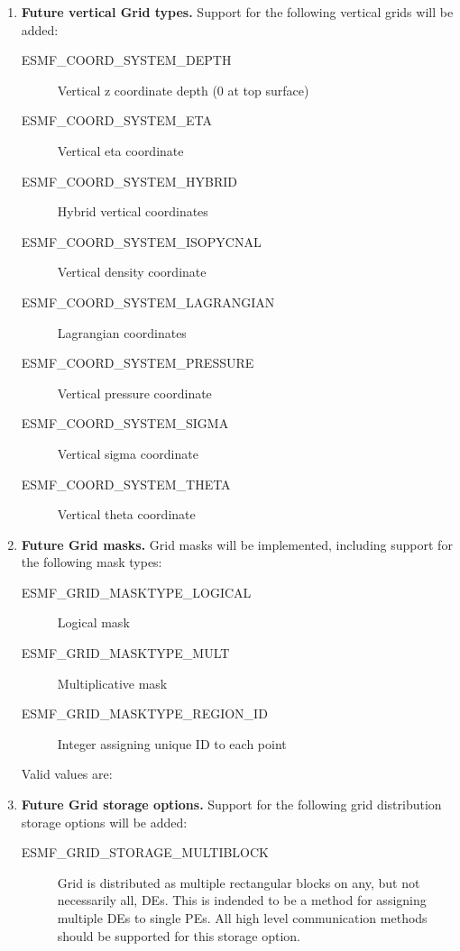 \begin{enumerate}
\item {\bf Future vertical Grid types.}  Support for the following
vertical grids will be added:
 \begin{description}
    \item [ESMF\_COORD\_SYSTEM\_DEPTH]
          Vertical z coordinate depth (0 at top surface)
    \item [ESMF\_COORD\_SYSTEM\_ETA]
          Vertical eta coordinate
    \item [ESMF\_COORD\_SYSTEM\_HYBRID]
          Hybrid vertical coordinates
    \item [ESMF\_COORD\_SYSTEM\_ISOPYCNAL]
          Vertical density coordinate
    \item [ESMF\_COORD\_SYSTEM\_LAGRANGIAN]
          Lagrangian coordinates
    \item [ESMF\_COORD\_SYSTEM\_PRESSURE]
          Vertical pressure coordinate
    \item [ESMF\_COORD\_SYSTEM\_SIGMA]
          Vertical sigma coordinate
    \item [ESMF\_COORD\_SYSTEM\_THETA]
          Vertical theta coordinate
 \end{description}

\item {\bf Future Grid masks.}  Grid masks will be implemented, including
support for the following mask types:
 \begin{description}
    \item [ESMF\_GRID\_MASKTYPE\_LOGICAL]
          Logical mask
    \item [ESMF\_GRID\_MASKTYPE\_MULT]
          Multiplicative mask
    \item [ESMF\_GRID\_MASKTYPE\_REGION\_ID]
          Integer assigning unique ID to each point
 \end{description}

    
 Valid values are:
\item {\bf Future Grid storage options.}  Support for the following grid
distribution storage options will be added:
 \begin{description}
    \item [ESMF\_GRID\_STORAGE\_MULTIBLOCK]
          Grid is distributed as multiple rectangular blocks on any, but not
          necessarily all, DEs.  This is indended to be a method for assigning
          multiple DEs to single PEs.  All high level communication methods
          should be supported for this storage option.
 \end{description}

\end{enumerate}


